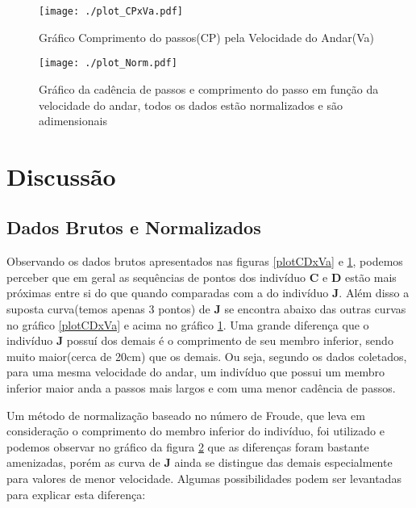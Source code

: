 \documentclass[a4paper,10pt]{article}
\begin{document}
\begin{figure}[h]

 \centering
 \texttt{[image: ./plot\_CPxVa.pdf]}
 \caption{Gráfico Comprimento do passos(CP) pela Velocidade do Andar(Va)}
 \label{plotCPxVa}
\end{figure}

\begin{figure}[h]
 \centering
 \texttt{[image: ./plot\_Norm.pdf]}
 \caption{Gráfico da cadência de passos e comprimento do passo em função da velocidade do andar, todos os dados estão normalizados e são adimensionais}
 \label{plotNorm}
\end{figure}


\FloatBarrier
\section{Discussão}

\subsection{Dados Brutos e Normalizados}
Observando os dados brutos apresentados nas figuras \ref{plotCDxVa} e \ref{plotCPxVa}, podemos perceber que em geral as sequências de pontos dos indivíduo \textbf{C} e \textbf{D} estão mais próximas entre si do que quando comparadas com a do indivíduo \textbf{J}. Além disso a suposta curva(temos apenas 3 pontos) de \textbf{J} se encontra 
abaixo das outras curvas no gráfico \ref{plotCDxVa} e acima no gráfico \ref{plotCPxVa}. 
Uma grande diferença que o indivíduo \textbf{J} possuí dos demais é o comprimento de seu membro inferior, sendo muito maior(cerca de 20cm) que os demais. Ou seja, segundo os dados coletados, para uma mesma velocidade do andar, um indivíduo que possui um membro inferior maior anda a passos mais largos e com uma menor cadência de passos.

Um método de normalização baseado no número de Froude, que leva em consideração o comprimento do membro inferior do indivíduo, foi utilizado e podemos observar no gráfico da figura \ref{plotNorm} que as diferenças foram bastante amenizadas, porém as curva de \textbf{J} ainda se distingue das demais especialmente para valores de menor velocidade. Algumas possibilidades podem ser levantadas para explicar esta diferença: 
\end{document}
